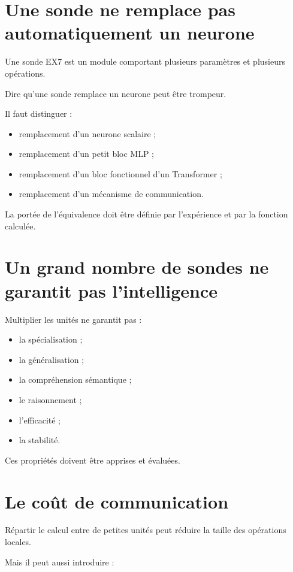 \documentclass[11pt,a4paper]{report}
\begin{document}
\section{Une sonde ne remplace pas automatiquement un neurone}

Une sonde EX7 est un module comportant plusieurs paramètres
et plusieurs opérations.

Dire qu'une sonde remplace un neurone peut être trompeur.

Il faut distinguer :

\begin{itemize}
  \item remplacement d'un neurone scalaire ;
  \item remplacement d'un petit bloc MLP ;
  \item remplacement d'un bloc fonctionnel d'un Transformer ;
  \item remplacement d'un mécanisme de communication.
\end{itemize}

La portée de l'équivalence doit être définie
par l'expérience et par la fonction calculée.

\section{Un grand nombre de sondes ne garantit pas l'intelligence}

Multiplier les unités ne garantit pas :

\begin{itemize}
  \item la spécialisation ;
  \item la généralisation ;
  \item la compréhension sémantique ;
  \item le raisonnement ;
  \item l'efficacité ;
  \item la stabilité.
\end{itemize}

Ces propriétés doivent être apprises et évaluées.

\section{Le coût de communication}

Répartir le calcul entre de petites unités peut réduire
la taille des opérations locales.

Mais il peut aussi introduire :
\end{document}
